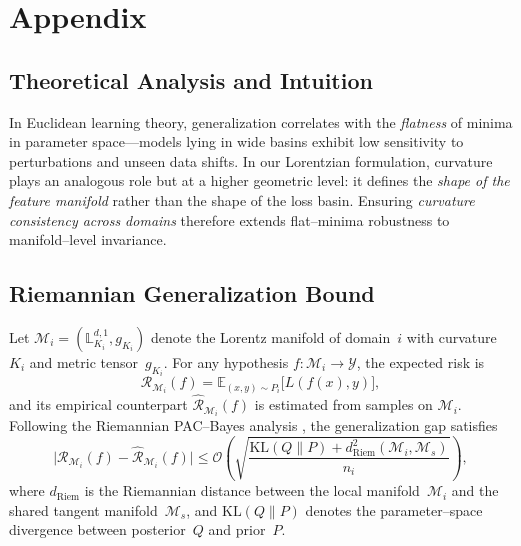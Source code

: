 \documentclass[10pt]{article} %
\begin{document}
\appendix
\section{Appendix}

\subsection{Theoretical Analysis and Intuition}

In Euclidean learning theory, generalization correlates with the
\emph{flatness} of minima in parameter space---models lying in wide
basins exhibit low sensitivity to perturbations and unseen data shifts.
In our Lorentzian formulation, curvature plays an analogous role but at
a higher geometric level: it defines the \emph{shape of the feature
manifold} rather than the shape of the loss basin. Ensuring
\emph{curvature consistency across domains} therefore extends
flat--minima robustness to manifold--level invariance.

\subsection{Riemannian Generalization Bound}
Let $\mathcal{M}_i=(\mathbb{L}^{d,1}_{K_i},g_{K_i})$ denote the
Lorentz manifold of domain~$i$ with curvature~$K_i$ and metric
tensor~$g_{K_i}$. For any hypothesis
$f:\mathcal{M}_i\!\to\!\mathcal{Y}$, the expected risk is
\begin{equation}
\mathcal{R}_{\mathcal{M}_i}(f)
   = \mathbb{E}_{(x,y)\sim P_i}\! \big[L(f(x),y)\big],
\end{equation}
and its empirical counterpart
$\hat{\mathcal{R}}_{\mathcal{M}_i}(f)$ is estimated from samples on
$\mathcal{M}_i$. Following the Riemannian PAC--Bayes analysis
\cite{liao2020pac}, the generalization gap satisfies
\begin{equation}
\big|\mathcal{R}_{\mathcal{M}_i}(f)
      - \hat{\mathcal{R}}_{\mathcal{M}_i}(f)\big|
\le
\mathcal{O}\!\left(
\sqrt{
\frac{\mathrm{KL}(Q\|P)
 + d_{\mathrm{Riem}}^2(\mathcal{M}_i,\mathcal{M}_s)}
      {n_i}}
\right),
\label{eq:riem_pac}
\end{equation}
where $d_{\mathrm{Riem}}$ is the Riemannian distance between the local
manifold~$\mathcal{M}_i$ and the shared tangent manifold~$\mathcal{M}_s$,
and $\mathrm{KL}(Q\|P)$ denotes the parameter--space divergence between
posterior~$Q$ and prior~$P$.
\end{document}
